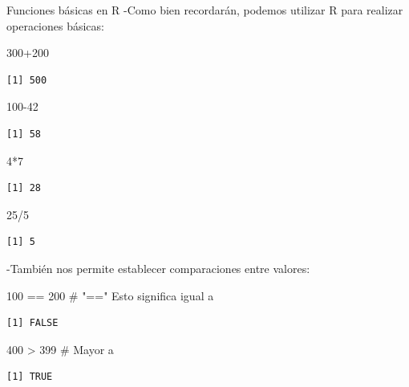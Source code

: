 \documentclass[
  30pt,
  ignorenonframetext,
]{beamer}
\newenvironment{Shaded}{\begin{snugshade}}{\end{snugshade}}
\newcommand{\CommentTok}[1]{\textcolor[rgb]{0.37,0.37,0.37}{#1}}
\newcommand{\DecValTok}[1]{\textcolor[rgb]{0.68,0.00,0.00}{#1}}
\newcommand{\SpecialCharTok}[1]{\textcolor[rgb]{0.37,0.37,0.37}{#1}}
\begin{document}
\begin{frame}[fragile]{Funciones básicas en R}
\label{funciones-buxe1sicas-en-r}
-Como bien recordarán, podemos utilizar R para realizar operaciones
básicas:

\begin{Shaded}
\begin{Highlighting}[]
\DecValTok{300}\SpecialCharTok{+}\DecValTok{200}
\end{Highlighting}
\end{Shaded}

\begin{verbatim}
[1] 500
\end{verbatim}

\begin{Shaded}
\begin{Highlighting}[]
\DecValTok{100{-}42}
\end{Highlighting}
\end{Shaded}

\begin{verbatim}
[1] 58
\end{verbatim}

\begin{Shaded}
\begin{Highlighting}[]
\DecValTok{4}\SpecialCharTok{*}\DecValTok{7}
\end{Highlighting}
\end{Shaded}

\begin{verbatim}
[1] 28
\end{verbatim}

\begin{Shaded}
\begin{Highlighting}[]
\DecValTok{25}\SpecialCharTok{/}\DecValTok{5}
\end{Highlighting}
\end{Shaded}

\begin{verbatim}
[1] 5
\end{verbatim}

-También nos permite establecer comparaciones entre valores:

\begin{Shaded}
\begin{Highlighting}[]
\DecValTok{100} \SpecialCharTok{==} \DecValTok{200} \CommentTok{\# "==" Esto significa igual a}
\end{Highlighting}
\end{Shaded}

\begin{verbatim}
[1] FALSE
\end{verbatim}

\begin{Shaded}
\begin{Highlighting}[]
\DecValTok{400} \SpecialCharTok{\textgreater{}} \DecValTok{399} \CommentTok{\# Mayor a}
\end{Highlighting}
\end{Shaded}

\begin{verbatim}
[1] TRUE
\end{verbatim}
\end{frame}
\end{document}
